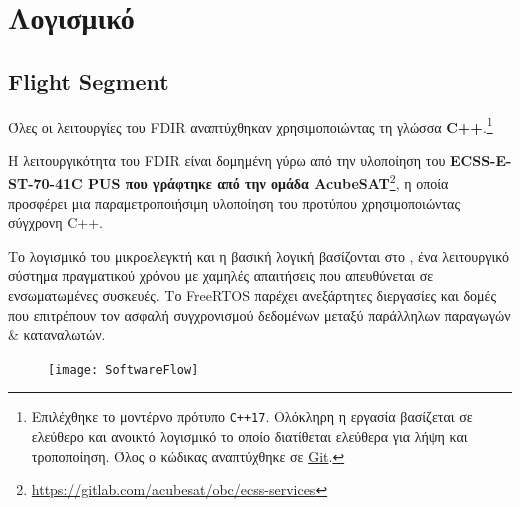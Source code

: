 \documentclass[a4paper,nobib]{tufte-book}
\begin{document}
\section{Λογισμικό}

\subsection{Flight Segment}

Όλες οι λειτουργίες του \ac{FDIR} αναπτύχθηκαν χρησιμοποιώντας τη γλώσσα \textbf{C++}.\footnote{Επιλέχθηκε το μοντέρνο πρότυπο \texttt{C++17}. Ολόκληρη η εργασία βασίζεται σε ελεύθερο και ανοικτό λογισμικό το οποίο διατίθεται ελεύθερα για λήψη και τροποποίηση. Όλος ο κώδικας αναπτύχθηκε σε \href{https://git-scm.com/}{Git}.}
	
	Η λειτουργικότητα του \ac{FDIR} είναι δομημένη γύρω από την υλοποίηση του \textbf{ECSS-E-ST-70-41C \ac{PUS} που γράφτηκε από την ομάδα AcubeSAT}\footnote{\url{https://gitlab.com/acubesat/obc/ecss-services}}, η οποία προσφέρει μια παραμετροποιήσιμη υλοποίηση του προτύπου χρησιμοποιώντας σύγχρονη C++.
	
	Το λογισμικό του μικροελεγκτή και η βασική λογική βασίζονται στο \textbf{}, ένα λειτουργικό σύστημα πραγματικού χρόνου με χαμηλές απαιτήσεις που απευθύνεται σε ενσωματωμένες συσκευές. Το FreeRTOS παρέχει ανεξάρτητες διεργασίες και δομές που επιτρέπουν τον ασφαλή συγχρονισμού δεδομένων μεταξύ παράλληλων παραγωγών \& καταναλωτών.
\begin{figure}[h]
	\texttt{[image: SoftwareFlow]}
	\caption{}
	\label{sec:softwareflow}
\end{figure}
\end{document}

